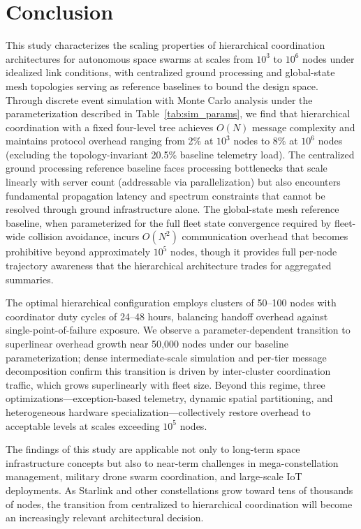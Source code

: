 \documentclass[journal]{IEEEtran}
\begin{document}
\section{Conclusion}

This study characterizes the scaling properties of hierarchical coordination architectures for autonomous space swarms at scales from $10^3$ to $10^6$ nodes under idealized link conditions, with centralized ground processing and global-state mesh topologies serving as reference baselines to bound the design space. Through discrete event simulation with Monte Carlo analysis under the parameterization described in Table~\ref{tab:sim_params}, we find that hierarchical coordination with a fixed four-level tree achieves $O(N)$ message complexity and maintains protocol overhead ranging from 2\% at $10^3$ nodes to 8\% at $10^6$ nodes (excluding the topology-invariant 20.5\% baseline telemetry load). The centralized ground processing reference baseline faces processing bottlenecks that scale linearly with server count (addressable via parallelization) but also encounters fundamental propagation latency and spectrum constraints that cannot be resolved through ground infrastructure alone. The global-state mesh reference baseline, when parameterized for the full fleet state convergence required by fleet-wide collision avoidance, incurs $O(N^2)$ communication overhead that becomes prohibitive beyond approximately $10^5$ nodes, though it provides full per-node trajectory awareness that the hierarchical architecture trades for aggregated summaries.

The optimal hierarchical configuration employs clusters of 50--100 nodes with coordinator duty cycles of 24--48 hours, balancing handoff overhead against single-point-of-failure exposure. We observe a parameter-dependent transition to superlinear overhead growth near 50{,}000 nodes under our baseline parameterization; dense intermediate-scale simulation and per-tier message decomposition confirm this transition is driven by inter-cluster coordination traffic, which grows superlinearly with fleet size. Beyond this regime, three optimizations---exception-based telemetry, dynamic spatial partitioning, and heterogeneous hardware specialization---collectively restore overhead to acceptable levels at scales exceeding $10^5$ nodes.

The findings of this study are applicable not only to long-term space infrastructure concepts but also to near-term challenges in mega-constellation management, military drone swarm coordination, and large-scale IoT deployments. As Starlink and other constellations grow toward tens of thousands of nodes, the transition from centralized to hierarchical coordination will become an increasingly relevant architectural decision.
\end{document}
